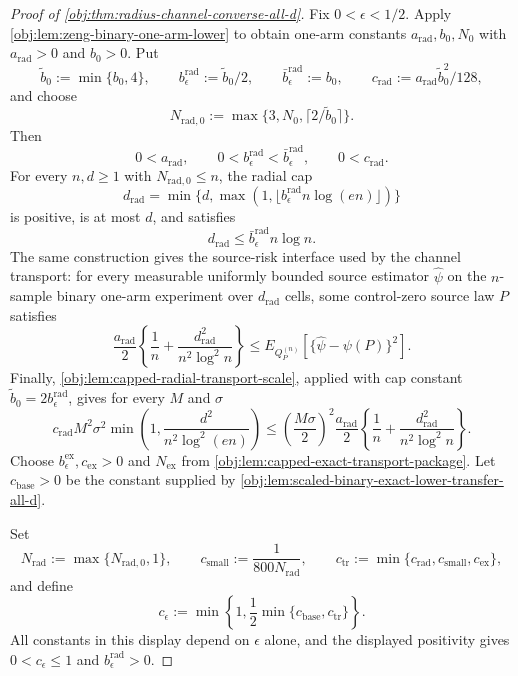 \documentclass[11pt]{article}
\begin{document}
\begin{proof}[Proof of \cref{obj:thm:radius-channel-converse-all-d}]
Fix \(0<\epsilon<1/2\).  Apply \cref{obj:lem:zeng-binary-one-arm-lower} to obtain one-arm constants
\(a_{\mathrm{rad}},b_0,N_0\) with \(a_{\mathrm{rad}}>0\) and \(b_0>0\).  Put
\[
\tilde b_0:=\min\{b_0,4\},
\qquad
b_{\epsilon}^{\mathrm{rad}}:=\tilde b_0/2,
\qquad
\bar b_{\epsilon}^{\mathrm{rad}}:=b_0,
\qquad
c_{\mathrm{rad}}:=a_{\mathrm{rad}}\tilde b_0^2/128,
\]
and choose
\[
N_{\mathrm{rad},0}:=\max\{3,N_0,\lceil 2/\tilde b_0\rceil\}.
\]
Then
\[
0<a_{\mathrm{rad}},
\qquad
0<b_{\epsilon}^{\mathrm{rad}}<\bar b_{\epsilon}^{\mathrm{rad}},
\qquad
0<c_{\mathrm{rad}}.
\]
For every \(n,d\ge1\) with \(N_{\mathrm{rad},0}\le n\), the radial cap
\[
d_{\mathrm{rad}}
=
\min\{d,\max(1,\lfloor b_{\epsilon}^{\mathrm{rad}}n\log(en)\rfloor)\}
\]
is positive, is at most \(d\), and satisfies
\[
d_{\mathrm{rad}}
\le
\bar b_{\epsilon}^{\mathrm{rad}}n\log n .
\]
The same construction gives the source-risk interface used by the channel transport: for every measurable uniformly bounded source estimator \(\widehat\psi\) on the \(n\)-sample binary one-arm experiment over \(d_{\mathrm{rad}}\) cells, some control-zero source law \(P\) satisfies
\[
\frac{a_{\mathrm{rad}}}{2}
\left\{\frac1n+\frac{d_{\mathrm{rad}}^2}{n^2\log^2 n}\right\}
\le
E_{Q_P^{(n)}}
\left[
\{\widehat\psi-\psi(P)\}^2
\right].
\]
Finally, \cref{obj:lem:capped-radial-transport-scale}, applied with cap constant \(\tilde b_0=2b_{\epsilon}^{\mathrm{rad}}\), gives for every \(M\) and \(\sigma\)
\[
c_{\mathrm{rad}}M^2\sigma^2
\min\left(1,\frac{d^2}{n^2\log^2(en)}\right)
\le
\left(\frac{M\sigma}{2}\right)^2
\frac{a_{\mathrm{rad}}}{2}
\left\{\frac1n+\frac{d_{\mathrm{rad}}^2}{n^2\log^2 n}\right\}.
\]
Choose \(b_{\epsilon}^{\mathrm{ex}},c_{\mathrm{ex}}>0\) and \(N_{\mathrm{ex}}\) from \cref{obj:lem:capped-exact-transport-package}.  Let \(c_{\mathrm{base}}>0\) be the constant supplied by \cref{obj:lem:scaled-binary-exact-lower-transfer-all-d}. %

Set
\[
N_{\mathrm{rad}}:=\max\{N_{\mathrm{rad},0},1\},
\qquad
c_{\mathrm{small}}:=\frac{1}{800N_{\mathrm{rad}}},
\qquad
c_{\mathrm{tr}}:=\min\{c_{\mathrm{rad}},c_{\mathrm{small}},c_{\mathrm{ex}}\},
\]
and define
\[
c_\epsilon
:=
\min\left\{1,\frac12\min\{c_{\mathrm{base}},c_{\mathrm{tr}}\}\right\}.
\]
All constants in this display depend on \(\epsilon\) alone, and the displayed positivity gives \(0<c_\epsilon\le1\) and \(b_{\epsilon}^{\mathrm{rad}}>0\). %


\end{proof}
\end{document}
